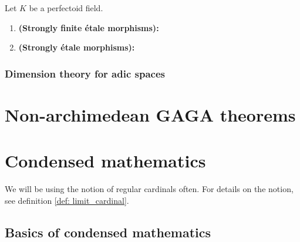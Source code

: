                     \begin{definition} \label{def: strongly_finite_etale_morphisms_of_adic_spaces}
                        Let $K$ be a perfectoid field.
                            \begin{enumerate}
                                \item \textbf{(Strongly finite \'etale morphisms):} 
                                \item \textbf{(Strongly \'etale morphisms):}
                            \end{enumerate}
                    \end{definition}
            
            \subsubsection{Dimension theory for adic spaces}
            
    \section{Non-archimedean GAGA theorems}
    
    \section{Condensed mathematics} \label{section: condensed_mathematics}
        \begin{remark}
            We will be using the notion of regular cardinals often. For details on the notion, see definition \ref{def: limit_cardinal}.
        \end{remark}
    
        \subsection{Basics of condensed mathematics}
